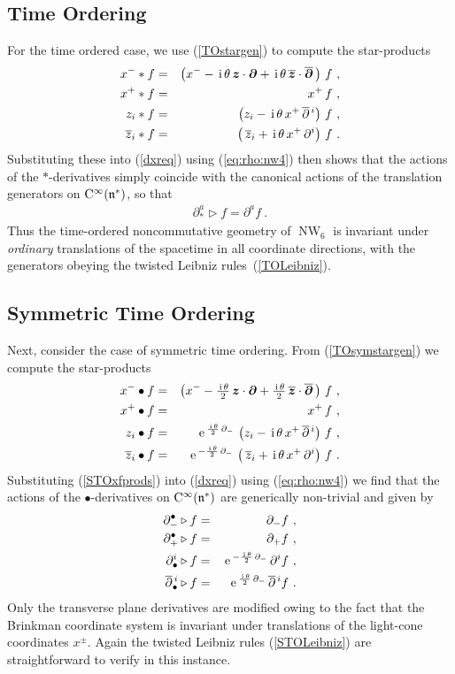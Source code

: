 \documentclass[11pt,a4paper]{article}
\DeclareMathOperator{\NW}{NW}
\newcommand{\1}{\mathbb{1}}
\newcommand{\mbf}[1]{{\boldsymbol {#1} }}
\def\ii{{\,{\rm i}\,}}
\def\CC{{\rm C}}
\def\mz{{\mbf z}}
\def\mdell{{\mbf\partial}}
\def\mfn{{\mathfrak n}}
\def\e{{\,\rm e}\,}
\def\bea{\begin{eqnarray}}
\def\eea{\end{eqnarray}}
\newcommand{\beq}{\begin{eqnarray}}
\newcommand{\eeq}{\end{eqnarray}}
\begin{document}
\subsection{Time Ordering \label{TOderiv}}

For the time ordered case, we use (\ref{TOstargen}) to compute the
star-products
\bea
x^-*f&=&\left(x^--\ii\theta\,\mz\cdot\mdell+\ii\theta\,
\overline{\mz}\cdot\overline{\mdell}\,\right)\,f \ , \nonumber\\
x^+*f&=&x^+\,f \ , \nonumber\\
z_i*f&=&\left(z_i-\ii\theta\,x^+\,\overline{\partial}{}^{\,i}
\right)\, f \ , \nonumber\\
\overline{z}_i*f&=&\left(\,\overline{z}_i+\ii\theta\,x^+\,\partial^i
\right)\,f \ .
\label{TOxfprods}\eea
Substituting these into (\ref{dxreq}) using (\ref{eq:rho:nw4}) then
shows that the actions of the $*$-derivatives simply coincide with the
canonical actions of the translation generators on
$\CC^\infty(\mfn^*)$, so that
\beq
\partial_*^a\triangleright f=\partial^af \ .
\label{TOderivs}\eeq
Thus the time-ordered noncommutative geometry of $\NW_6$ is invariant
under {\it ordinary} translations of the spacetime in all coordinate
directions, with the generators obeying the twisted Leibniz
rules~(\ref{TOLeibniz}).

\subsection{Symmetric Time Ordering \label{STOderiv}}

Next, consider the case of symmetric time ordering. From
(\ref{TOsymstargen}) we compute the star-products
\bea
x^-\bullet f&=&\left(x^--\mbox{$\frac{\ii\theta}2$}\,
\mz\cdot\mdell+\mbox{$\frac{\ii\theta}2$}\,\overline{\mz}
\cdot\overline{\mdell}\,\right)\,f \ , \nonumber\\
x^+\bullet f&=&x^+\,f \ , \nonumber\\
z_i\bullet f&=&\e^{\frac{\ii\theta}2\,\partial_-}\,
\left(z_i-\ii\theta\,x^+\,\overline{\partial}{}^{\,i}
\right)\,f  \ , \nonumber\\
\overline{z}_i\bullet f&=&\e^{-\frac{\ii\theta}2\,\partial_-}\,
\left(\,\overline{z}_i+\ii\theta\,
x^+\,\partial^i\right)\,f \ .
\label{STOxfprods}\eea
Substituting (\ref{STOxfprods}) into (\ref{dxreq}) using
(\ref{eq:rho:nw4}) we find that the actions of the
$\bullet$-derivatives on $\CC^\infty(\mfn^*)$ are generically
non-trivial and given by
\bea
\partial_-^\bullet\triangleright f&=&\partial_-f \ , \nonumber\\
\partial_+^\bullet\triangleright f&=&\partial_+f \ , \nonumber\\
\partial^i_\bullet\triangleright f&=&\e^{-\frac{\ii\theta}2\,
\partial_-}\,\partial^if \ , \nonumber\\
\overline{\partial}{}^{\,i}_\bullet\triangleright f&=&
\e^{\frac{\ii\theta}2\,\partial_-}\,
\overline{\partial}{}^{\,i}f \ .
\label{STOderivs}\eea
Only the transverse plane derivatives are modified owing to the fact
that the Brinkman coordinate system is invariant under translations of
the light-cone coordinates $x^\pm$. Again the twisted Leibniz rules
(\ref{STOLeibniz}) are straightforward to verify in this instance.
\end{document}
